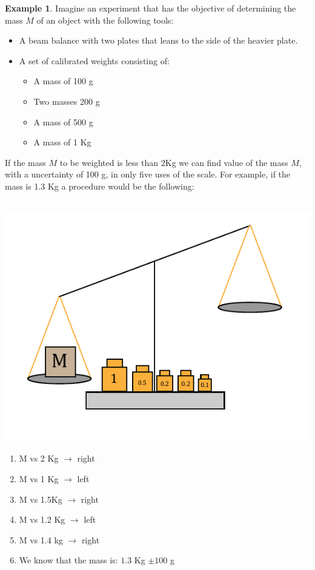 \documentclass[11pt,a4paper,twoside]{report}
\newcommand{\+}{\textnormal{+} }
\theoremstyle{definition}
\newtheorem{myex}[mythm]{Example}
\numberwithin{equation}{chapter}
\begin{document}
\begin{myex}
  
  Imagine an experiment that has the objective of determining the mass $M$ of an
  object with the following tools:
  
  \begin{itemize}
    \item A beam balance with two plates that leans to the side of the heavier
    plate. 
    \item A set of calibrated weights consisting of:
    \begin{itemize}
      \item A mass of 100 g
      \item Two masses 200 g
      \item A mass of 500 g
      \item A mass of 1 Kg
    \end{itemize}  
  \end{itemize}

If the mass $M$ to be weighted is less than $2$Kg we can find value of the mass
$M$, with a uncertainty of 100 g, in only five uses of the scale. For example,
if the mass is 1.3 Kg a procedure would be the following:
\\\\
\begin{minipage}[]{0.5\linewidth}
  \centering
  \strut\vspace*{-\baselineskip}\newline\includegraphics[width=0.8\linewidth]{figures/scale.pdf}
\end{minipage}
\begin{minipage}[]{0.4\linewidth}
  \begin{enumerate}
  \item M vs 2 Kg $\rightarrow$ right
  \item M vs 1 Kg $\rightarrow$ left
  \item  M vs 1.5Kg $\rightarrow$ right
  \item  M vs 1.2 Kg $\rightarrow$ left
  \item  M vs 1.4 kg $\rightarrow$ right
  \item  We know that the mass is: $1.3$ Kg $\pm 100$ g
\end{enumerate}
\end{minipage}
\\\\


\end{myex}
\end{document}
